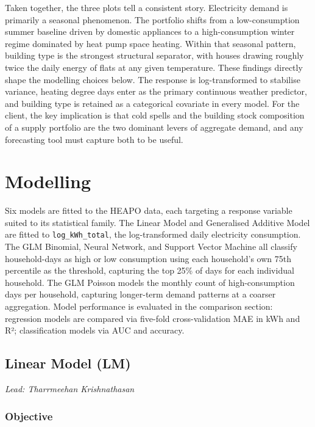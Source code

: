 \documentclass[
]{article}
\begin{document}
Taken together, the three plots tell a consistent story. Electricity
demand is primarily a seasonal phenomenon. The portfolio shifts from a
low-consumption summer baseline driven by domestic appliances to a
high-consumption winter regime dominated by heat pump space heating.
Within that seasonal pattern, building type is the strongest structural
separator, with houses drawing roughly twice the daily energy of flats
at any given temperature. These findings directly shape the modelling
choices below. The response is log-transformed to stabilise variance,
heating degree days enter as the primary continuous weather predictor,
and building type is retained as a categorical covariate in every model.
For the client, the key implication is that cold spells and the building
stock composition of a supply portfolio are the two dominant levers of
aggregate demand, and any forecasting tool must capture both to be
useful.

\section{Modelling}\label{modelling}

Six models are fitted to the HEAPO data, each targeting a response
variable suited to its statistical family. The Linear Model and
Generalised Additive Model are fitted to \texttt{log\_kWh\_total}, the
log-transformed daily electricity consumption. The GLM Binomial, Neural
Network, and Support Vector Machine all classify household-days as high
or low consumption using each household's own 75th percentile as the
threshold, capturing the top 25\% of days for each individual household.
The GLM Poisson models the monthly count of high-consumption days per
household, capturing longer-term demand patterns at a coarser
aggregation. Model performance is evaluated in the comparison section:
regression models are compared via five-fold cross-validation MAE in kWh
and R²; classification models via AUC and accuracy.

\subsection{Linear Model (LM)}\label{lm}

\emph{Lead: Tharrmeehan Krishnathasan}

\subsubsection{Objective}\label{objective}
\end{document}
